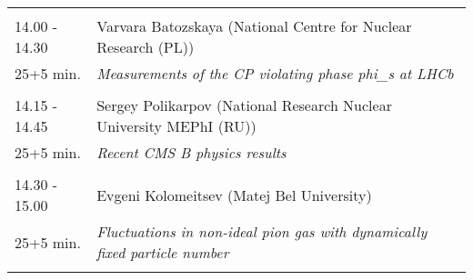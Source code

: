 \begin{longtable}{p{3cm}p{13cm}}
 & \\ 
14.00 - 14.30 & Varvara Batozskaya (National Centre for Nuclear Research (PL))\\ 
25+5 min. & {\it Measurements of the CP violating phase phi\_s at LHCb}\\ 
 & \\ 
14.15 - 14.45 & Sergey Polikarpov (National Research Nuclear  University MEPhI (RU))\\ 
25+5 min. & {\it Recent CMS B physics results}\\ 
 & \\ 
14.30 - 15.00 & Evgeni Kolomeitsev (Matej Bel University)\\ 
25+5 min. & {\it Fluctuations in non-ideal pion gas with dynamically fixed particle number}\\ 
 & \\ 
\end{longtable}

